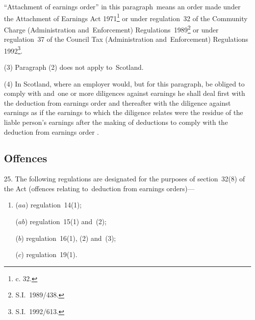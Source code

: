 \documentclass[12pt,a4paper]{article}
\begin{document}
“Attachment of earnings order” in this paragraph~means an order made under the Attachment of Earnings Act 1971\footnote{ c. 32.} or under regulation~32 of the Community Charge (Administration and~Enforcement) Regulations~1989\footnote{\frenchspacing S.I.~1989/438.}
or under regulation~37 of the Council Tax (Administration and~Enforcement) Regulations 1992\footnote{\frenchspacing  S.I.~1992/613.}. %

(3) Paragraph (2) does not apply to~Scotland.

(4) In Scotland, where an employer would, but for this paragraph, be obliged to comply with 
and~one or more diligences against earnings he shall deal first with the deduction from earnings order%
and thereafter with the diligence against earnings as if the earnings to which the diligence relates were the residue of the liable person’s earnings after the making of deductions to comply with the deduction from earnings order%
.


\subsection[25. Offences]{Offences}

25.  The following regulations are designated for the purposes of section~32(8) of the Act (offences relating to~deduction from earnings orders)—
\begin{enumerate}\item[]
($aa$) regulation~14(1);

($ab$)  %
regulation~15(1) and~(2);

($b$) regulation~16(1), (2) and~(3);

($c$) regulation~19(1).
\end{enumerate}
\end{document}

